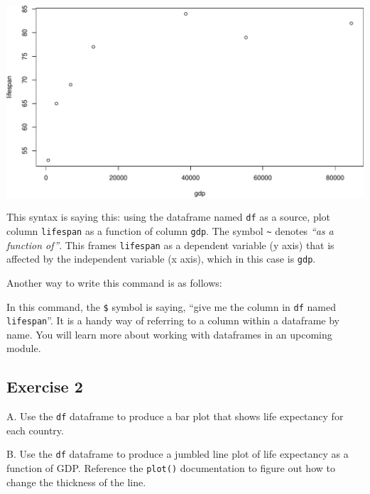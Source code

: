 \documentclass[
]{book}
\newenvironment{Shaded}{\begin{snugshade}}{\end{snugshade}}
\newcommand{\KeywordTok}[1]{\textcolor[rgb]{0.13,0.29,0.53}{\textbf{#1}}}
\newcommand{\NormalTok}[1]{#1}
\newcommand{\OperatorTok}[1]{\textcolor[rgb]{0.81,0.36,0.00}{\textbf{#1}}}
\newcommand{\StringTok}[1]{\textcolor[rgb]{0.31,0.60,0.02}{#1}}
\begin{document}
\includegraphics{figures/unnamed-chunk-116-1.pdf}

This syntax is saying this: using the dataframe named \texttt{df} as a source, plot column \texttt{lifespan} as a function of column \texttt{gdp}. The symbol \texttt{\textasciitilde{}} denotes \emph{``as a function of''}. This frames \texttt{lifespan} as a dependent variable (y axis) that is affected by the independent variable (x axis), which in this case is \texttt{gdp}.

Another way to write this command is as follows:

\begin{Shaded}
\end{Shaded}

In this command, the \texttt{\$} symbol is saying, ``give me the column in \texttt{df} named \texttt{lifespan}''. It is a handy way of referring to a column within a dataframe by name. You will learn more about working with dataframes in an upcoming module.

\hypertarget{exercise-2-4}{%
\subsection*{Exercise 2}\label{exercise-2-4}}

A. Use the \texttt{df} dataframe to produce a bar plot that shows life expectancy for each country.

B. Use the \texttt{df} dataframe to produce a jumbled line plot of life expectancy as a function of GDP. Reference the \texttt{plot()} documentation to figure out how to change the thickness of the line.
\end{document}
